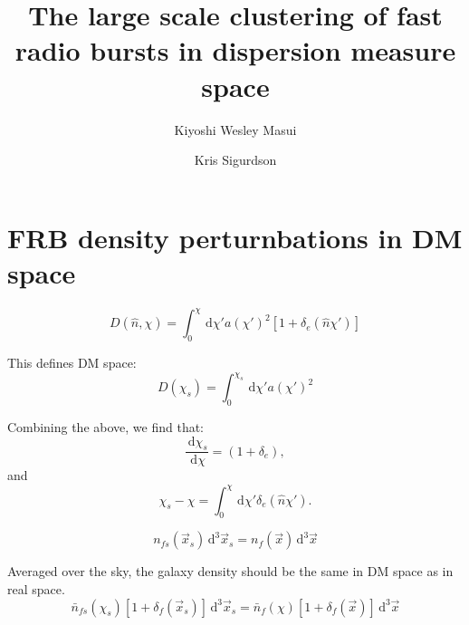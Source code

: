 \documentclass[onecolumn,prd,nofootinbib]{revtex4-1}
\newcommand{\ud}{\,\mathrm{d}}
\begin{document}
\title{The large scale clustering of fast radio bursts in dispersion measure space}

\author{Kiyoshi Wesley Masui}

\author{Kris Sigurdson}


\begin{abstract}

\end{abstract}

\maketitle

\section{FRB density perturnbations in DM space}

\begin{equation}
D(\hat n, \chi) = \int_0^\chi \ud \chi' a(\chi')^2
   \left[1 + \delta_e(\hat{n}\chi')\right]
\end{equation}

This defines DM space:
\begin{equation}
D(\chi_s) =  \int_0^{\chi_s} \ud \chi' a(\chi')^2
\end{equation}

Combining the above, we find that:
\begin{equation}
\frac{\ud \chi_s}{\ud \chi} = (1 + \delta_e),
\end{equation}
and
\begin{equation}
\chi_s - \chi = \int_0^\chi \ud \chi' \delta_e(\hat n \chi').
\end{equation}

\begin{equation}
\label{e:density}
n_{fs}(\vec x_s) \ud^3\vec x_s = n_{f}(\vec x) \ud^3\vec x
\end{equation}

Averaged over the sky, the galaxy density should be the same in DM 
space as in real space.
\begin{equation}
\bar{n}_{fs}(\chi_s)\left[ 1 + \delta_f(\vec x_s)\right] \ud^3\vec x_s
    = \bar{n}_{f}(\chi)\left[ 1 + \delta_f(\vec x)\right] \ud^3\vec x
\end{equation}
\end{document}

